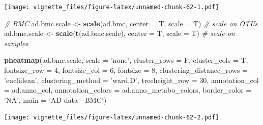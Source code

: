 \documentclass[]{book}
\newenvironment{Shaded}{\begin{snugshade}}{\end{snugshade}}
\newcommand{\KeywordTok}[1]{\textcolor[rgb]{0.13,0.29,0.53}{\textbf{#1}}}
\newcommand{\DataTypeTok}[1]{\textcolor[rgb]{0.13,0.29,0.53}{#1}}
\newcommand{\DecValTok}[1]{\textcolor[rgb]{0.00,0.00,0.81}{#1}}
\newcommand{\StringTok}[1]{\textcolor[rgb]{0.31,0.60,0.02}{#1}}
\newcommand{\CommentTok}[1]{\textcolor[rgb]{0.56,0.35,0.01}{\textit{#1}}}
\newcommand{\NormalTok}[1]{#1}
\begin{document}
\texttt{[image: vignette\_files/figure-latex/unnamed-chunk-62-1.pdf]}

\begin{Shaded}
\begin{Highlighting}[]
\CommentTok{# BMC}
\NormalTok{ad.bmc.scale <-}\StringTok{ }\KeywordTok{scale}\NormalTok{(ad.bmc, }\DataTypeTok{center =}\NormalTok{ T, }\DataTypeTok{scale =}\NormalTok{ T) }\CommentTok{# scale on OTUs}
\NormalTok{ad.bmc.scale <-}\StringTok{ }\KeywordTok{scale}\NormalTok{(}\KeywordTok{t}\NormalTok{(ad.bmc.scale), }\DataTypeTok{center =}\NormalTok{ T, }\DataTypeTok{scale =}\NormalTok{ T) }\CommentTok{# scale on samples}

\KeywordTok{pheatmap}\NormalTok{(ad.bmc.scale, }
         \DataTypeTok{scale =} \StringTok{'none'}\NormalTok{, }
         \DataTypeTok{cluster_rows =}\NormalTok{ F, }
         \DataTypeTok{cluster_cols =}\NormalTok{ T, }
         \DataTypeTok{fontsize_row =} \DecValTok{4}\NormalTok{, }\DataTypeTok{fontsize_col =} \DecValTok{6}\NormalTok{,}
         \DataTypeTok{fontsize =} \DecValTok{8}\NormalTok{,}
         \DataTypeTok{clustering_distance_rows =} \StringTok{'euclidean'}\NormalTok{,}
         \DataTypeTok{clustering_method =} \StringTok{'ward.D'}\NormalTok{,}
         \DataTypeTok{treeheight_row =} \DecValTok{30}\NormalTok{,}
         \DataTypeTok{annotation_col =}\NormalTok{ ad.anno_col,}
         \DataTypeTok{annotation_colors =}\NormalTok{ ad.anno_metabo_colors,}
         \DataTypeTok{border_color =} \StringTok{'NA'}\NormalTok{,}
         \DataTypeTok{main =} \StringTok{'AD data - BMC'}\NormalTok{)}
\end{Highlighting}
\end{Shaded}

\texttt{[image: vignette\_files/figure-latex/unnamed-chunk-62-2.pdf]}
\end{document}
